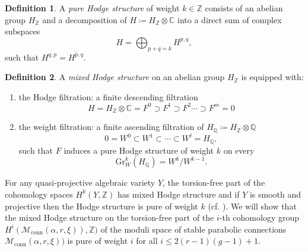 \documentclass[11pt, reqno]{amsart}
\numberwithin{equation}{section}
\theoremstyle{definition}
\newtheorem{definition}{Definition}[section]
\begin{document}
\begin{definition}
    A \textit{pure Hodge structure} of weight $k \in \mathbb{Z}$ consists of an abelian group $H_\mathbb{Z}$ and a decomposition of $H \coloneqq H_\mathbb{Z} \otimes \mathbb{C}$ into a direct sum of complex subspaces
    \[
    H = \bigoplus_{p+q=k} H^{p,q},
    \]
    such that $H^{q,p} = \overline{H^{p,q}}$.
\end{definition}
  \begin{definition}
      A \textit{mixed Hodge structure} on an abelian group $H_\mathbb{Z}$ is equipped with:
      \begin{enumerate}
          \item \textnormal{the Hodge filtration: a finite descending filtration}
          \[
          H = H_\mathbb{Z}\otimes \mathbb{C} = F^0 \supset F^1 \supset F^2 \cdots \supset F^m=0
          \]
          \item \textnormal{the weight filtration: a finite ascending filtration of} $H_\mathbb{Q} \coloneqq H_\mathbb{Z}\otimes \mathbb{Q}$
          \[
          0 =W^0 \subset W^1 \subset \cdots \subset W^l = H_\mathbb{Q},
          \]
          such that $F$ induces a pure Hodge structure of weight $k$ on every $$\mathrm{Gr}^k_W(H_\mathbb{Q}) = W^k/W^{k-1}.$$
      \end{enumerate}
  \end{definition}  
For any quasi-projective algebraic variety $Y$, the torsion-free part of the cohomology spaces $H^k(Y,\mathbb{Z})$ has mixed Hodge structure and if $Y$ is smooth and projective then the Hodge structure is pure of weight $k$ (cf. \cite{D72, D75}). We will show that the mixed Hodge structure on the torsion-free part of the $i$-th cohomology group $H^i(\mathcal{M}_{\mathrm{conn}}(\alpha, r, \xi)), \mathbb{Z})$ of the moduli space of stable parabolic connections $\mathcal{M}_{\mathrm{conn}}(\alpha, r, \xi))$ is pure of weight $i$ for all $i\leq 2(r-1)(g-1)+1$.
\end{document}
